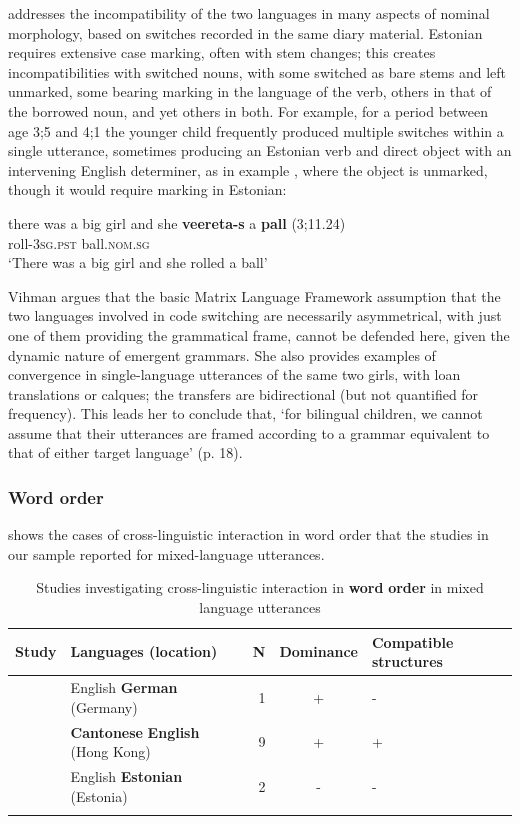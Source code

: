 \documentclass[output=paper]{langscibook}
\begin{document}
\citet{Vihman2018} addresses the incompatibility of the two languages in many aspects of nominal morphology, based on switches recorded in the same diary material. Estonian requires extensive case marking, often with stem changes; this creates incompatibilities with switched nouns, with some switched as bare stems and left unmarked, some bearing marking in the language of the verb, others in that of the borrowed noun, and yet others in both. For example, for a period between age 3;5 and 4;1 the younger child frequently produced multiple switches within a single utterance, sometimes producing an Estonian verb and direct object with an intervening English determiner, as in example , where the object is unmarked, though it would require marking in Estonian:

\ea%
    \label{ex:vihmannvihmann:3}
           {there was a big girl and she}
     \gll \textbf{{veereta-s}} {a} \textbf{{pall}} (3;11.24)\\
        roll-\textsc{3sg.pst}   ball.\textsc{nom.sg}\\
\glt `There was a big girl and she rolled a ball'
\z

Vihman argues that the basic Matrix Language Framework assumption that the two languages involved in code switching are necessarily asymmetrical, with just one of them providing the grammatical frame, cannot be defended here, given the dynamic nature of emergent grammars. She also provides examples of convergence in single-language utterances of the same two girls, with loan translations or calques; the transfers are bidirectional (but not quantified for frequency). This leads her to conclude that, ‘for bilingual children, we cannot assume that their utterances are framed according to a grammar equivalent to that of either target language’ (p. 18). 

\subsubsection{Word order}

 shows the cases of cross-linguistic interaction in word order that the studies in our sample reported for mixed-language utterances.

\begin{table}
\begin{tabularx}{\textwidth}{QQrcp{1.8cm}}
\lsptoprule
{ Study} & { Languages} { (location)} & { N}  & { Dominance} & {{ Compatible structures}}\\
\midrule
\citet{Gawlitzek-MaiwaldTracy1996} & English \textbf{German} (Germany) & 1 & { +} & -\\
\tablevspace
\citet{YipMatthews2016} & \textbf{Cantonese} \textbf{English} (Hong Kong) & 9 & + & { +}\\
\tablevspace
\citet{Vihman2018} & English \textbf{Estonian} (Estonia) & 2 & - & { -}\\
\lspbottomrule
\end{tabularx}
\caption{Studies investigating cross-linguistic interaction in \textbf{word} \textbf{order} in mixed language utterances}
\label{tab:vihmannvihmann:11}
\end{table}
\end{document}
